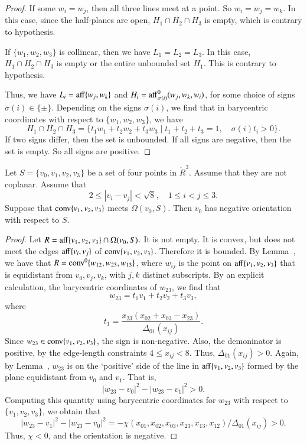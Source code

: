 \begin{proof}  If some $w_i=w_j$, then all three lines meet
at a point.  So $w_i=w_j=w_k$.  In this case, since the half-planes
are open, $H_1\cap H_2\cap H_3$ is empty, which is contrary to 
hypothesis.  

If $\{w_1,w_2,w_3\}$ is collinear, then we have $L_1=L_2=L_3$.
In this case, $H_1\cap H_2\cap H_3$ is empty or the entire
unbounded set $H_1$.  This is contrary to hypothesis.

Thus, we have $L_i = {\operatorname{aff}}\{w_j,w_k\}$ and
$H_i = {\operatorname{aff}}^0_{\sigma(i)}({w_j,w_k},w_i)$, for some choice of
signs $\sigma(i)\in\{\pm\}$.  
Depending on the signs $\sigma(i)$, we find that in barycentric
coordinates with respect to $\{w_1,w_2,w_3\}$, we have
  $$H_1\cap H_2\cap H_3 =
    \{ t_1 w_1 + t_2 w_2 +t_3 w_3 \mid
         t_1 + t_2 + t_3 = 1,\quad  \sigma(i)t_i > 0\}.$$
If two signs differ, then the set is unbounded.  If all signs
are negative, then the set is empty.  So all signs are positive.
\end{proof}


\newpage

\begin{lemma}
Let $S=\{v_0,v_1,v_2,v_3\}$ be a set of four points in $\ring{R}^3$.
Assume that they are not coplanar.
Assume that 
$$
2\le |v_i-v_j|<\sqrt8,\quad 1\le i < j \le 3.
$$
  Suppose that
${\operatorname{conv}}\{v_1,v_2,v_3\}$ meets $\Omega(v_0,S)$.  Then $v_0$ has negative
orientation with respect to $S$.
\end{lemma}

\begin{proof} Let $R = {\operatorname{aff}}\{v_1,v_2,v_3\}\cap\Omega(v_0,S)$.
It is not empty.  It is convex, but does not meet the edges
${\operatorname{aff}}\{v_i,v_j\}$ of ${\operatorname{conv}}\{v_1,v_2,v_3\}$.  Therefore it
is bounded.  By Lemma~, we have that
$R = {\operatorname{conv}}^0\{w_{12},w_{23},w_{13}\}$, where $w_{ij}$ is the point
on ${\operatorname{aff}}\{v_1,v_2,v_3\}$ that is equidistant from $v_0,v_j,v_k$,
with $j,k$ distinct subscripts.  By an explicit calculation,
the barycentric coordinates of $w_{23}$, we find that
   $$w_{23} = t_1 v_1 + t_2 v_2 + t_3 v_3,$$
where $$t_1 = \frac{x_{23} (x_{02} + x_{03} - x_{23})}{\Delta_{01}(x_{ij})}.$$
Since $w_{23}\in{\operatorname{conv}}\{v_1,v_2,v_3\}$, the sign is non-negative.
Also, the demoninator is positive, by the edge-length constraints
$4\le x_{ij} < 8$.  Thus, $\Delta_{01}(x_{ij}) > 0$.
Again, by Lemma~, $w_{23}$ is on the `positive'
side of the line in ${\operatorname{aff}}\{v_1,v_2,v_3\}$ formed by the plane
equidistant from $v_0$ and $v_1$.  That is,
   $$|w_{23}-v_0|^2 - |w_{23}-v_1|^2 > 0.$$
Computing this quantity using barycentric coordinates for $w_{23}$
with respect
to $\{v_1,v_2,v_3\}$, we obtain that
   $$|w_{23}-v_1|^2 - |w_{23}-v_0|^2 = 
   -\chi(x_{01},x_{02},x_{03},x_{23},x_{13},x_{12})/{\Delta_{01}(x_{ij})} >0.$$
Thus, $\chi < 0$, and the orientation is negative.
\end{proof}





